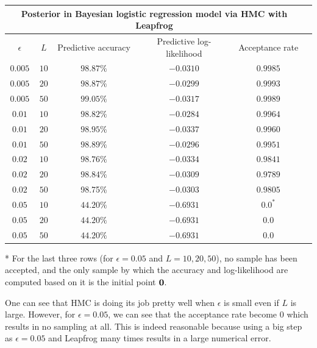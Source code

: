 \documentclass[12pt, fullpage,letterpaper]{article}
\def\red{\color{black!30!red}}
\begin{document}
\begin{enumerate}
\begin{enumerate}
{\begin{center}
\begin{tabular}{ |c||c|c|c|c|c|}
 \hline
 \multicolumn{5}{|c|}{Posterior in Bayesian logistic regression model via HMC with Leapfrog} \\
 \hline
 $\epsilon$& $L$ & Predictive accuracy & Predictive log-likelihood & Acceptance rate\\
 \hline
 $0.005$   & $10$    & $98.87\%$ &   $-0.0310$ & $0.9985$\\
 \hline
 $0.005$   & $20$    & $98.87\%$ &   $-0.0299$ & $0.9993$\\
 \hline
 $0.005$   & $50$    & $99.05\%$ &  $-0.0317$  & $0.9989$\\
  \hline
  \hline
 $0.01$   & $10$    & $98.82\%$ &   $-0.0284$ & $0.9964$\\  
 \hline
 $0.01$   & $20$    & $98.95\%$ &   $-0.0337$ & $0.9960$\\
\hline
 $0.01$   & $50$    & $98.89\%$ &   $-0.0296$ & $0.9951$\\
 \hline
 \hline
 $0.02$   & $10$    & $98.76\%$ &   $-0.0334$ & $0.9841$\\  
 \hline
 $0.02$   & $20$    & $98.84\%$ &   $-0.0309$ & $0.9789$\\
\hline
 $0.02$   & $50$    &98.75\%&   $-0.0303$ & $0.9805$\\ 
 \hline
 \hline
 $0.05$   & $10$    & $44.20\%$ &  $ -0.6931$   & $0.0^*$\\  
 \hline
 $0.05$   & $20$    & $44.20\%$ &    $-0.6931$  & $0.0$\\
\hline
 $0.05$   & $50$    & $44.20\%$ &    $-0.6931$  & $0.0$\\
 \hline
\end{tabular}
\end{center}
{\red * For the last three rows (for $\epsilon = 0.05$ and $L=10,20,50$), no sample has been accepted, and the only sample by which the accuracy and log-likelihood are computed based on it is the initial point ${\bf 0}$. }


One can see that HMC is doing its job pretty well when $\epsilon$ is small even if $L$ is large. 
However, for $\epsilon = 0.05$, we can see that the acceptance rate become $0$ which results in no sampling at all.  This is indeed reasonable because using a big step as $\epsilon = 0.05$ and Leapfrog many times results in a large numerical error. 
}
		

\end{enumerate}
\end{enumerate}
\end{document}

